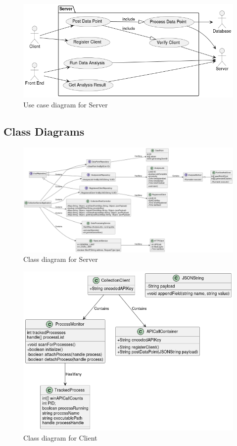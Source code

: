 \documentclass[titlepage]{article}
\begin{document}
\begin{figure}[H]
\includegraphics[scale=.7]{server.png}
\caption{Use case diagram for Server }
\centering
\end{figure}

\subsection{Class Diagrams}


\begin{figure}[H]
\includegraphics[scale=.325]{classDiagrams/server.png}
\caption{Class diagram for Server}

\end{figure}

\begin{figure}[H]
\includegraphics[scale=.6]{classDiagrams/client.png}
\caption{Class diagram for Client}
\centering
\end{figure}
\end{document}

